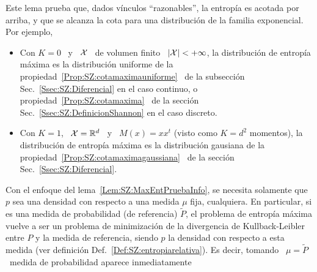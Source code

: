 %
Este lema prueba que, dados  v\'inculos ``razonables'', la entrop\'ia es acotada
por  arriba, y que  se alcanza  la cota  para una  distribuci\'on de  la familia
exponencial. Por ejemplo,
%
\begin{itemize}
\item Con  $K =  0$ \  y \  $\mathcal{X}$ \ de  volumen finito  \ $|\mathcal{X}|  < +  \infty$, la
  distribuci\'on  de entrop\'ia  m\'axima es  la distribuci\'on  uniforme de  la
  propiedad~\ref{Prop:SZ:cotamaximauniforme}     \     de    la     subsecci\'on
  Sec.~\ref{Ssec:SZ:Diferencial}      en      el      caso      continuo,      o
  propiedad~\ref{Prop:SZ:cotamaxima}        \       de        la       secci\'on
  Sec.~\ref{Ssec:SZ:DefinicionShannon} en el caso discreto.
%
\item Con $K = 1$,  \ $\mathcal{X} = \mathbb{R}^d$ \ y \ $M(x) = x  x^t$ (visto como $K = d^2$
  momentos),  la  distribuci\'on de  entrop\'ia  m\'axima  es la  distribuci\'on
  gausiana de  la propiedad~\ref{Prop:SZ:cotamaximagaussiana} \  de la secci\'on
  Sec.~\ref{Ssec:SZ:Diferencial}.
\end{itemize}
%
Con el enfoque del lema~\ref{Lem:SZ:MaxEntPruebaInfo}, se necesita solamente que
$p$  sea una  densidad con  respecto  a una  medida $\mu$  fija, cualquiera.   En
particular, si es una medida de probabilidad (de referencia) $\widetilde{P}$, el
problema de entrop\'ia m\'axima vuelve a ser un problema de minimizaci\'on de la
divergencia de Kullback-Leibler entre $P$  y la medida de referencia, siendo $p$
la    densidad    con    respecto     a    esta    medida    (ver    definici\'on
Def.~\ref{Def:SZ:entropiarelativa}). Es decir, tomando \ $\mu = \widetilde{P}$ \
medida de probabilidad aparece inmediatamente


